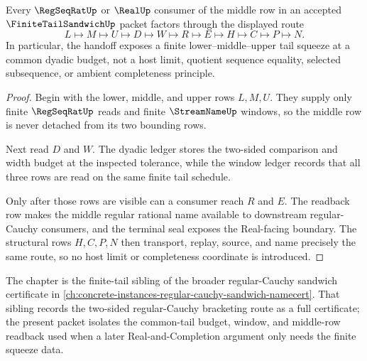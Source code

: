 \begin{theorem}
\label{thm:finite-tail-sandwich-regseqrat-handoff}
Every $\RegSeqRatUp$ or $\RealUp$ consumer of the middle row in an accepted $\FiniteTailSandwichUp$ packet factors through the displayed route
$$
L\longmapsto M\longmapsto U\longmapsto D\longmapsto W\longmapsto R\longmapsto E\longmapsto H\longmapsto C\longmapsto P\longmapsto N .
$$
In particular, the handoff exposes a finite lower--middle--upper tail squeeze at a common dyadic budget, not a host limit, quotient sequence equality, selected subsequence, or ambient completeness principle.
\end{theorem}
\begin{proof}
Begin with the lower, middle, and upper rows $L,M,U$. They supply only finite $\RegSeqRatUp$ reads and finite $\StreamNameUp$ windows, so the middle row is never detached from its two bounding rows.

Next read $D$ and $W$. The dyadic ledger stores the two-sided comparison and width budget at the inspected tolerance, while the window ledger records that all three rows are read on the same finite tail schedule.

Only after those rows are visible can a consumer reach $R$ and $E$. The readback row makes the middle regular rational name available to downstream regular-Cauchy consumers, and the terminal seal exposes the Real-facing boundary. The structural rows $H,C,P,N$ then transport, replay, source, and name precisely the same route, so no host limit or completeness coordinate is introduced.
\end{proof}

The chapter is the finite-tail sibling of the broader regular-Cauchy sandwich certificate in \autoref{ch:concrete-instances-regular-cauchy-sandwich-namecert}. That sibling records the two-sided regular-Cauchy bracketing route as a full certificate; the present packet isolates the common-tail budget, window, and middle-row readback used when a later Real-and-Completion argument only needs the finite squeeze data.


